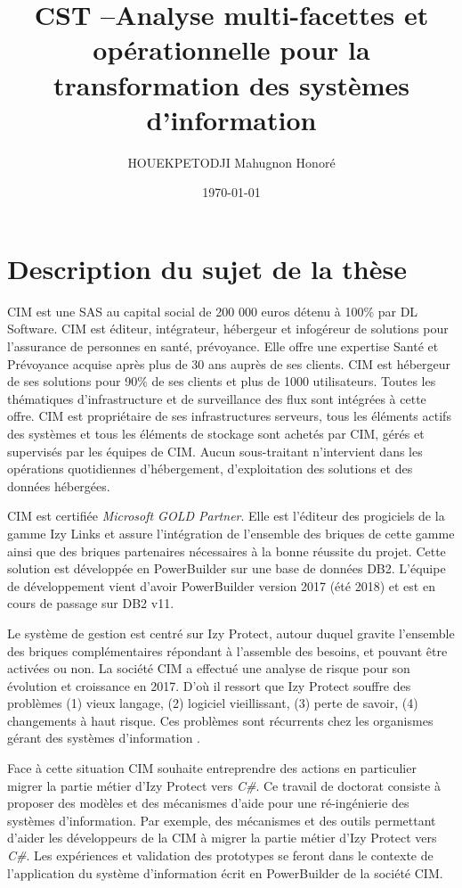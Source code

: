 \documentclass[a4paper]{article}
\title{CST --Analyse multi-facettes et opérationnelle pour la transformation des systèmes d’information}
\author{ HOUEKPETODJI Mahugnon Honoré}
\begin{document}
\institution{}

\date{\today}

\maketitle

\section{Description du sujet de la thèse}
CIM est une SAS au capital social de 200 000 euros détenu à 100\% par DL Software. 
CIM est éditeur, intégrateur, hébergeur et infogéreur de solutions pour l'assurance de personnes en santé, prévoyance. 
Elle offre une expertise Santé et Prévoyance acquise après plus de 30 ans auprès de ses clients. 
CIM est hébergeur de ses solutions pour 90\% de ses clients et plus de 1000 utilisateurs. 
Toutes les thématiques d'infrastructure et de surveillance des flux sont intégrées à cette offre.
CIM est propriétaire de ses infrastructures serveurs, tous les éléments actifs des systèmes et tous les éléments de stockage sont achetés par CIM, gérés et supervisés par les équipes de CIM. Aucun sous-traitant n'intervient dans les opérations quotidiennes d'hébergement, d'exploitation des solutions et des données hébergées.

CIM est certifiée \textit{Microsoft GOLD Partner}. 
Elle est l'éditeur des progiciels de la gamme Izy Links et assure l'intégration de l'ensemble des briques de cette gamme ainsi que des briques partenaires nécessaires à la bonne réussite du projet.
 Cette solution est développée en PowerBuilder sur une base de données DB2.
L'équipe de développement vient d'avoir PowerBuilder version 2017 (été 2018) et est en cours de passage sur DB2 v11.

Le système de gestion est centré sur Izy Protect, autour duquel gravite l'ensemble des briques complémentaires répondant à l'assemble des besoins, et pouvant être activées ou non. 
La société CIM a effectué une analyse de risque pour son évolution et croissance en 2017.
D'où il ressort que Izy Protect souffre des problèmes 
(1) vieux langage,
(2) logiciel vieillissant,
(3) perte de savoir,
(4) changements à haut risque.
Ces problèmes sont récurrents chez les organismes gérant des systèmes d'information \cite{Deme02a}.

Face à cette situation CIM souhaite entreprendre des actions en particulier migrer la partie métier d'Izy Protect vers \textit{C\#}.
Ce travail de doctorat consiste à proposer des modèles et des mécanismes d'aide pour une ré-ingénierie des systèmes d'information. 
Par exemple, des mécanismes et des outils permettant d'aider les développeurs  de la CIM à migrer la partie métier d'Izy Protect vers \textit{C\#}.
Les expériences et validation des prototypes se feront dans le contexte de l'application du système d'information écrit en PowerBuilder de la société CIM.
\end{document}
